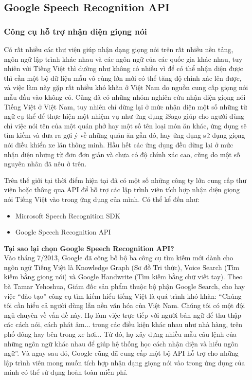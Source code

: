 \documentclass[12pt]{report}
\begin{document}
\subsection{Google Speech Recognition API}
\subsubsection{Công cụ hỗ trợ nhận diện giọng nói}
Có rất nhiều các thư viện giúp nhận dạng giọng nói trên rất nhiều nền tảng, ngôn ngữ lập trình khác nhau và các ngôn ngữ của các quốc gia khác nhau, tuy nhiên với Tiếng Việt thì dường như không có nhiều vì để có thể nhận diện được thì cần một bộ dữ liệu mẫu vô cùng lớn mới có thể tăng độ chính xác lên được, và việc làm này gặp rất nhiều khó khăn ở Việt Nam do nguồn cung cấp giọng nói mẫu đầu vào không có. Cũng đã có những nhóm nghiên cứu nhận diện giọng nói Tiếng Việt ở Việt Nam, tuy nhiên chỉ dừng lại ở mức nhận diện một số những từ ngữ cụ thể để thực hiện một nhiệm vụ như ứng dụng iSago giúp cho người dùng chỉ việc nói tên của một quán phở hay một số tên loại món ăn khác, ứng dụng sẽ tìm kiếm và đưa ra gợi ý về những quán ăn gần đó, hay ứng dụng sử dụng giọng nói điều khiển xe lăn thông minh. Hầu hết các ứng dụng đều dừng lại ở mức nhận diện những từ đơn đơn giản và chưa có độ chính xác cao, cũng do một số nguyên nhân đã nêu ở trên.

Trên thế giới tại thời điểm hiện tại đã có một số những công ty lớn cung cấp thư viện hoặc thông qua API để hỗ trợ các lập trình viên tích hợp nhận diện giọng nói Tiếng Việt vào trong ứng dụng của mình. Có thể kể đến như:

\begin{itemize}
	\item Microsoft Speech Recognition SDK
	\item Google Speech Recognition API
\end{itemize}
\noindent \textbf{Tại sao lại chọn Google Speech Recognition API?}\\[0.3cm]
\noindent Vào tháng 7/2013, Google đã công bố bộ ba công cụ tìm kiếm mới dành cho ngôn ngữ Tiếng Việt là Knowledge Graph (Sơ đồ Tri thức), Voice Search (Tìm kiếm bằng giọng nói) và Google Handwrite (Tìm kiếm bằng chữ viết tay). Theo bà Tamar Yehoshua, Giám đốc sản phẩm thuộc bộ phận Google Search, cho hay việc ``đào tạo'' công cụ tìm kiếm hiểu tiếng Việt là quá trình khó khăn: ``Chúng tôi cần hiểu cả người dùng lẫn nền văn hóa của Việt Nam. Chúng tôi có một đội ngũ chuyên về vấn đề này. Họ làm việc trực tiếp với người bản ngữ để thu thập các cách nói, cách phát âm... trong các điều kiện khác nhau như nhà hàng, trên phố đông hay bên trong xe hơi... Từ đó, họ xây dựng nhiều mẫu câu lệnh của những ngôn ngữ khác nhau để giúp hệ thống học cách nhận diện và hiểu ngôn ngữ''\cite{google-vietnamese}. Và ngay sau đó, Google cũng đã cung cấp một bộ API hỗ trợ cho những lập trình viên mong muốn tích hợp nhận dạng giọng nói vào trong ứng dụng của mình có thể sử dụng hoàn toàn miễn phí.
\end{document}
